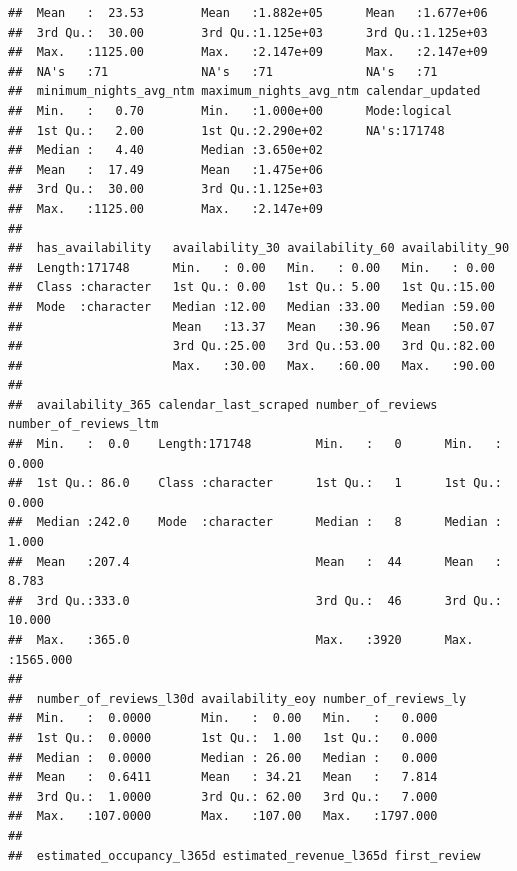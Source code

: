 \documentclass[
]{article}
\begin{document}
\begin{verbatim}
##  Mean   :  23.53        Mean   :1.882e+05      Mean   :1.677e+06     
##  3rd Qu.:  30.00        3rd Qu.:1.125e+03      3rd Qu.:1.125e+03     
##  Max.   :1125.00        Max.   :2.147e+09      Max.   :2.147e+09     
##  NA's   :71             NA's   :71             NA's   :71            
##  minimum_nights_avg_ntm maximum_nights_avg_ntm calendar_updated
##  Min.   :   0.70        Min.   :1.000e+00      Mode:logical    
##  1st Qu.:   2.00        1st Qu.:2.290e+02      NA's:171748     
##  Median :   4.40        Median :3.650e+02                      
##  Mean   :  17.49        Mean   :1.475e+06                      
##  3rd Qu.:  30.00        3rd Qu.:1.125e+03                      
##  Max.   :1125.00        Max.   :2.147e+09                      
##                                                                
##  has_availability   availability_30 availability_60 availability_90
##  Length:171748      Min.   : 0.00   Min.   : 0.00   Min.   : 0.00  
##  Class :character   1st Qu.: 0.00   1st Qu.: 5.00   1st Qu.:15.00  
##  Mode  :character   Median :12.00   Median :33.00   Median :59.00  
##                     Mean   :13.37   Mean   :30.96   Mean   :50.07  
##                     3rd Qu.:25.00   3rd Qu.:53.00   3rd Qu.:82.00  
##                     Max.   :30.00   Max.   :60.00   Max.   :90.00  
##                                                                    
##  availability_365 calendar_last_scraped number_of_reviews number_of_reviews_ltm
##  Min.   :  0.0    Length:171748         Min.   :   0      Min.   :   0.000     
##  1st Qu.: 86.0    Class :character      1st Qu.:   1      1st Qu.:   0.000     
##  Median :242.0    Mode  :character      Median :   8      Median :   1.000     
##  Mean   :207.4                          Mean   :  44      Mean   :   8.783     
##  3rd Qu.:333.0                          3rd Qu.:  46      3rd Qu.:  10.000     
##  Max.   :365.0                          Max.   :3920      Max.   :1565.000     
##                                                                                
##  number_of_reviews_l30d availability_eoy number_of_reviews_ly
##  Min.   :  0.0000       Min.   :  0.00   Min.   :   0.000    
##  1st Qu.:  0.0000       1st Qu.:  1.00   1st Qu.:   0.000    
##  Median :  0.0000       Median : 26.00   Median :   0.000    
##  Mean   :  0.6411       Mean   : 34.21   Mean   :   7.814    
##  3rd Qu.:  1.0000       3rd Qu.: 62.00   3rd Qu.:   7.000    
##  Max.   :107.0000       Max.   :107.00   Max.   :1797.000    
##                                                              
##  estimated_occupancy_l365d estimated_revenue_l365d first_review      

\end{verbatim}
\end{document}
